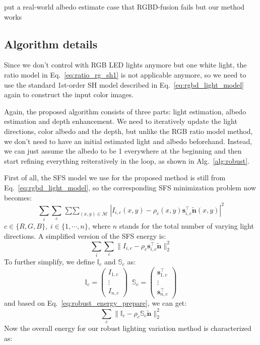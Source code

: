 {\color{red} put a real-world albedo estimate case that RGBD-fusion fails but our method works}


\subsection{Algorithm details}
Since we don't control with RGB LED lights anymore but one white light, the ratio model in Eq.~\ref{eq:ratio_rg_sh1} is not applicable anymore, so we need to use the standard 1st-order SH model described in Eq.~\ref{eq:rgbd_light_model} again to construct the input color images.

Again, the proposed algorithm consists of three parts: light estimation, albedo estimation and depth enhancement. 
We need to iteratively update the light directions, color albedo and the depth, but unlike the RGB ratio model method, we don't need to have an initial estimated light and albedo beforehand.
Instead, we can just assume the albedo to be 1 everywhere at the beginning and then start refining everything reiteratively in the loop, as shown in Alg.~\ref{alg:robust}.

First of all, the SFS model we use for the proposed method is still from Eq.~\ref{eq:rgbd_light_model}, so the corresponding SFS minimization problem now becomes:
\begin{equation}
    \sum_{i} \sum_{c} \mathop{\sum \sum}_{(x,y) \in \mathcal{M}} | I_{i,c}(x,y) - \rho_c(x,y) \mathbf{s}_{i,c}^\top\tilde{\mathbf{n}}(x,y) |^2 
\end{equation}
$c\in\{R,G,B\},\; i\in\{ 1, \cdots, n\}$, where $n$ stands for the total number of varying light directions.
A simplified version of the SFS energy is:
\begin{equation}
    \sum_{i} \sum_{c} \lVert I_{i,c} - \rho_c \mathbf{s}_{i,c}^\top\tilde{\mathbf{n}}\rVert_2^2 
\end{equation}
To further simplify, we define $\mathbb{I}_c$ and $\mathbb{S}_c$ as:
\begin{equation}\label{eq:robust_energy_prepare}
\mathbb{I}_c = \begin{pmatrix} I_{1,c} \\ \vdots \\ I_{n,c} \end{pmatrix}  \; \; \mathbb{S}_c = \begin{pmatrix} \mathbf{s}_{1,c}^\top \\ \vdots \\ \mathbf{s}_{n,c}^\top \end{pmatrix}
\end{equation}
and based on Eq.~\ref{eq:robust_energy_prepare}, we can get:
\begin{equation}
    \sum_{c} \lVert \mathbb{I}_c - \rho_c \mathbb{S}_{c}\tilde{\mathbf{n}}\rVert_2^2 
\end{equation}
Now the overall energy for our robust lighting variation method is characterized as:

